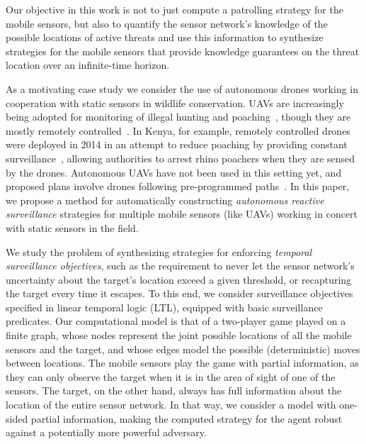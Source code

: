 Our objective in this work  is not to just compute a patrolling strategy for the mobile sensors, but also to quantify the sensor network's knowledge of the possible locations of active threats and use this information to synthesize strategies for the mobile sensors that provide knowledge guarantees on the threat location over an infinite-time horizon.

As a motivating case study we consider the use of autonomous drones working in cooperation with static sensors in wildlife conservation. UAVs are increasingly being adopted for monitoring of illegal hunting and poaching~\cite{schiffman2014drones}, though they are mostly remotely controlled~\cite{mulero2014remotely}. In Kenya, for example, remotely controlled drones were deployed in 2014 in an attempt to reduce poaching  by providing constant surveillance~\cite{Kenya}, allowing authorities to arrest rhino poachers when they are sensed by the drones. Autonomous UAVs  have not been used in this setting yet, and proposed plans involve drones following pre-programmed paths~\cite{Koh12}. In this paper, we propose a method for automatically constructing  \emph{autonomous reactive surveillance} strategies for multiple mobile sensors (like UAVs) working in concert with static sensors in the field. 

We study the problem of synthesizing strategies for enforcing \emph{temporal surveillance objectives}, such as the requirement to never let the sensor network's uncertainty about the target's location exceed a given threshold, or recapturing the target every time it escapes. To this end, we consider surveillance objectives specified in linear temporal logic (LTL), equipped with basic surveillance predicates. Our computational model is that of a two-player game played on a finite graph, whose nodes represent the joint possible locations of all the mobile sensors and the target, and whose edges model the possible (deterministic) moves between locations. The mobile sensors play the game with partial information, as they can only observe the target when  it is in the area of sight of one of the sensors. The target, on the other hand, always has full information about the location of the entire sensor network. In that way, we consider a model with one-sided partial information, making the computed strategy for the agent robust against a potentially more powerful adversary.


